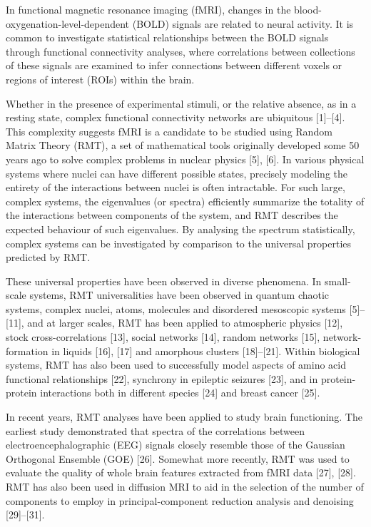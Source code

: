 In functional magnetic resonance imaging (fMRI), changes in the blood-oxygenation-level-dependent
(BOLD) signals are related to neural activity. It is common to investigate statistical relationships
between the BOLD signals through functional connectivity analyses, where correlations between
collections of these signals are examined to infer connections between different voxels or regions
of interest (ROIs) within the brain.

Whether in the presence of experimental stimuli, or the relative absence, as in a resting state,
complex functional connectivity networks are ubiquitous [1]–[4]. This complexity suggests fMRI is a
candidate to be studied using Random Matrix Theory (RMT), a set of mathematical tools originally
developed some 50 years ago to solve complex problems in nuclear physics [5], [6]. In various
physical systems where nuclei can have different possible states, precisely modeling the entirety of
the interactions between nuclei is often intractable. For such large, complex systems, the
eigenvalues (or spectra) efficiently summarize the totality of the interactions between components
of the system, and RMT describes the expected behaviour of such eigenvalues. By analysing the
spectrum statistically, complex systems can be investigated by comparison to the universal
properties predicted by RMT.

\begin{sloppypar}
These universal properties have been observed in diverse phenomena. In small-scale systems, RMT
universalities have been observed in quantum chaotic systems, complex nuclei, atoms, molecules and
disordered mesoscopic systems [5]–[11], and at larger scales, RMT has been applied to atmospheric
physics [12], stock cross-correlations [13], social networks [14], random networks [15],
network-formation in liquids [16], [17] and amorphous clusters [18]–[21]. Within biological systems,
RMT has also been used to successfully model aspects of  amino acid functional relationships [22],
synchrony in epileptic seizures [23], and in protein-protein interactions both in different species
[24] and breast cancer [25].
\end{sloppypar}

In recent years, RMT analyses have been applied to study brain functioning.  The earliest  study
demonstrated that spectra of the correlations between electroencephalographic (EEG) signals closely
resemble those of the Gaussian Orthogonal Ensemble (GOE) [26].  Somewhat more recently, RMT was used
to evaluate the quality of whole brain features extracted from fMRI data [27], [28]. RMT has also
been used in diffusion MRI to aid in the selection of the number of components to employ in
principal-component reduction analysis and denoising [29]–[31].

